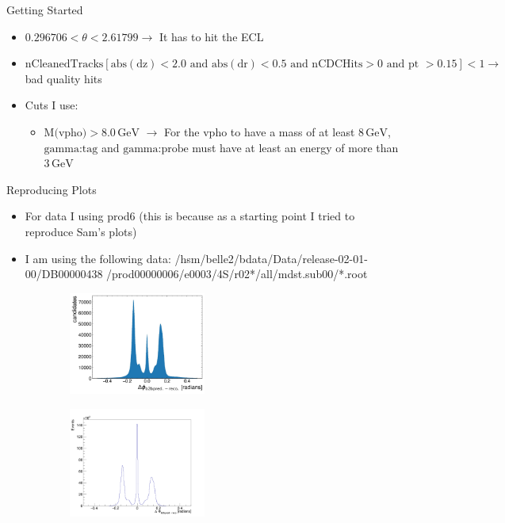 \documentclass[10pt]{beamer}
\begin{document}
{\begin{frame}{Getting Started}
\begin{itemize}
	
		\begin{itemize}
			\item $0.296706 < \theta < 2.61799 \rightarrow$ It has to hit the ECL
			\item $\textrm{nCleanedTracks}[ \textrm{abs}(\textrm{dz}) < 2.0 \textrm{ and } \textrm{abs}(\textrm{dr}) < 0.5 \textrm{ and nCDCHits} > 0 \textrm{ and pt } > 0.15] < 1 \rightarrow $ bad quality hits 
						
		\end{itemize}
	
\end{itemize}

\begin{itemize}
	\item Cuts I use:
	\begin{itemize}
		\item $\textrm{M(vpho)}>8.0\, \textrm{GeV}$ $\rightarrow$ For the vpho to have a mass of at least $8\,\textrm{GeV}$, $\textrm{gamma:tag}$ and $\textrm{gamma:probe}$ must have at least an energy of more than $3\,\textrm{GeV}$
	
	\end{itemize}
\end{itemize}

	
\end{frame}

\begin{frame}{Reproducing Plots}
	
\begin{itemize}
	\item For data I using prod6 (this is because as a starting point I tried to reproduce Sam's plots)
	\item I am using the following data: /hsm/belle2/bdata/Data/release-02-01-00/DB00000438 /prod00000006/e0003/4S/r02*/all/mdst.sub00/*.root
\end{itemize}

	
	\begin{figure}
		\begin{subfigure}{.5\textwidth}
			\centering
			\includegraphics[width=4.5cm]{Plots/deltaPhiSam.jpeg}
			
			\label{fig:sub1}
		\end{subfigure}%
		\begin{subfigure}{.5\textwidth}
			\centering
			\includegraphics[width=4.5cm]{Plots/DeltaPhi.png}
			

\end{subfigure}
\end{figure}
\end{frame}}
\end{document}
